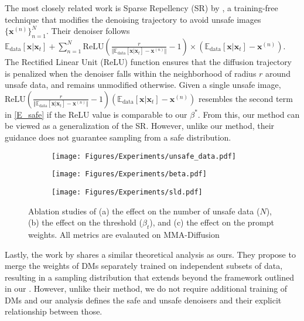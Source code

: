 The most closely related work is  Sparse Repellency (SR) by \citet{kirchhof2024sparse}, a training-free technique that modifies the denoising trajectory to avoid unsafe images $\{\mathbf{x}^{(n)} \}_{n=1}^N$. Their denoiser follows $\mathbb{E}_{\text{data}}[\mathbf{x}\vert\mathbf{x}_{t}]+\sum_{n=1}^{N}\text{ReLU}\left(\tfrac{r}{\Vert\mathbb{E}_{\text{data}}[\mathbf{x}\vert\mathbf{x}_{t}]-\mathbf{x}^{(n)}\Vert}-1\right) \times(\mathbb{E}_{\text{data}}[\mathbf{x}\vert\mathbf{x}_{t}]-\mathbf{x}^{(n)}).$
%
%
%
The Rectified Linear Unit (ReLU) function ensures that the diffusion trajectory is penalized when the denoiser falls within the neighborhood of radius $r$ around unsafe data, and remains unmodified otherwise. 
Given a single unsafe image, $\text{ReLU}\left(\tfrac{r}{\Vert\mathbb{E}_{\text{data}}[\mathbf{x}\vert\mathbf{x}_{t}]-\mathbf{x}^{(n)}\Vert}-1\right) (\mathbb{E}_{\text{data}}[\mathbf{x}\vert \mathbf{x}_{t}]-\mathbf{x}^{(n)})$ resembles the second term in \eqref{E_safe} if the ReLU value is comparable to our $\beta^*$. From this, our method can be viewed as a generalization of the SR.
%
%
However, unlike our method, their guidance does not guarantee sampling from a safe distribution. 

%
%

%



\begin{figure*}[t]%
	\centering
 \begin{subfigure}{0.33\linewidth}
		\centering
		\texttt{[image: Figures/Experiments/unsafe\_data.pdf]}
        \vskip -0.05in
	\end{subfigure}
    \hfil
 \begin{subfigure}{0.33\linewidth}
		\centering
		\texttt{[image: Figures/Experiments/beta.pdf]}
        \vskip -0.05in
	\end{subfigure}
    \hfil
 \begin{subfigure}{0.33\linewidth}
		\centering
		\texttt{[image: Figures/Experiments/sld.pdf]}
        \vskip -0.05in
	\end{subfigure}
 \vskip -0.05in
	\caption{Ablation studies of (a) the effect on the number of unsafe data ($N$), (b) the effect on the threshold ($\beta_{t}$), and (c) the effect on the prompt weights. All metrics are evalauted on MMA-Diffusion}
    \label{fig:ablation}
\end{figure*}

Lastly, the work by \citet{biggs2024diffusion} shares a similar theoretical analysis as ours. They propose to merge the weights of DMs separately trained on independent subsets of data, resulting in a sampling distribution that extends beyond the framework outlined in our . %
However, unlike their method, we do not require additional training of DMs and our analysis defines the safe and unsafe denoisers and their explicit relationship between those. 

%
%
